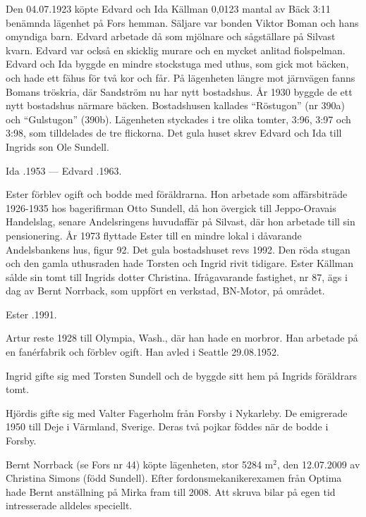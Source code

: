 Den 04.07.1923 köpte Edvard och Ida Källman 0,0123 mantal av Bäck 3:11 benämnda lägenhet på Fors hemman. Säljare var bonden Viktor Boman och hans omyndiga barn. Edvard arbetade då som mjölnare och sågställare på Silvast kvarn. Edvard var också en skicklig murare och en mycket anlitad fiolspelman. Edvard och Ida byggde en mindre stockstuga	med uthus, som gick mot bäcken, och hade ett fähus för två kor och får. På lägenheten längre mot järnvägen fanns Bomans tröskria, där 	Sandström nu har nytt bostadshus. År 1930 byggde de ett nytt bostadshus närmare bäcken. Bostadshusen kallades ``Röstugon'' (nr 390a) och 	``Gulstugon'' (390b). Lägenheten styckades i tre olika tomter, 3:96, 3:97 och 	3:98, som tilldelades de tre flickorna. Det gula huset skrev Edvard och Ida till Ingrids son Ole Sundell.

Ida .1953 --- Edvard .1963.

Ester förblev ogift och bodde med föräldrarna. Hon arbetade som affärsbiträde 1926-1935 hos bagerifirman Otto Sundell, då hon övergick till Jeppo-Oravais Handelslag, senare Andelsringens huvudaffär på Silvast, där hon arbetade till sin pensionering. År 1973 flyttade Ester till en mindre lokal i dåvarande Andelsbankens hus, figur 92. Det gula bostadshuset revs 1992. Den röda stugan och den gamla uthusraden hade Torsten och Ingrid rivit tidigare. Ester Källman sålde sin tomt till Ingrids dotter Christina. Ifrågavarande fastighet, nr 87, ägs i dag av Bernt Norrback, som uppfört en verkstad, BN-Motor, på området.

Ester .1991.

Artur reste 1928 till Olympia, Wash., där han hade en morbror. Han 	arbetade på en fanérfabrik och förblev ogift. Han avled i Seattle 	29.08.1952.

Ingrid gifte sig med Torsten Sundell och de byggde sitt hem på Ingrids föräldrars tomt.

Hjördis gifte sig med Valter Fagerholm från Forsby i Nykarleby. De emigrerade 1950 till Deje i Värmland, Sverige. Deras två pojkar föddes när de bodde i Forsby.






Bernt Norrback (se Fors nr 44) köpte lägenheten, stor 5284 m$^2$, den 12.07.2009  av Christina Simons (född Sundell). Efter fordonsmekanikerexamen från Optima hade Bernt anställning på Mirka fram till 2008. Att skruva bilar på egen tid intresserade alldeles speciellt.

